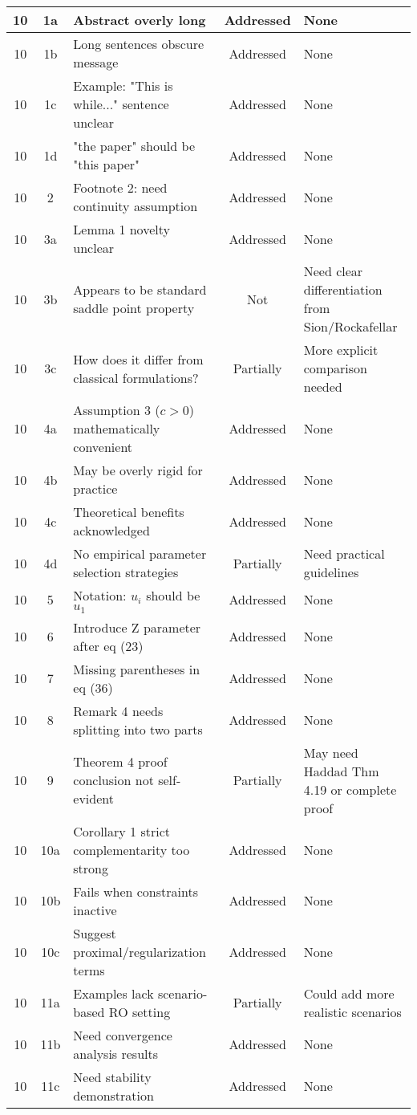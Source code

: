 \documentclass{article}
\begin{document}
\begin{longtable}{|c|c|p{5cm}|c|p{4cm}|}
10 & 1a & Abstract overly long & Addressed & None \\
\hline
10 & 1b & Long sentences obscure message & Addressed & None \\
\hline
10 & 1c & Example: "This is while..." sentence unclear & Addressed & None \\
\hline
10 & 1d & "the paper" should be "this paper" & Addressed & None \\
\hline
10 & 2 & Footnote 2: need continuity assumption & Addressed & None \\
\hline
10 & 3a & Lemma 1 novelty unclear & Addressed & None \\
\hline
10 & 3b & Appears to be standard saddle point property & Not & Need clear differentiation from Sion/Rockafellar \\
\hline
10 & 3c & How does it differ from classical formulations? & Partially & More explicit comparison needed \\
\hline
10 & 4a & Assumption 3 ($c>0$) mathematically convenient & Addressed & None \\
\hline
10 & 4b & May be overly rigid for practice & Addressed & None \\
\hline
10 & 4c & Theoretical benefits acknowledged & Addressed & None \\
\hline
10 & 4d & No empirical parameter selection strategies & Partially & Need practical guidelines \\
\hline
10 & 5 & Notation: $u_i$ should be $u_1$ & Addressed & None \\
\hline
10 & 6 & Introduce Z parameter after eq (23) & Addressed & None \\
\hline
10 & 7 & Missing parentheses in eq (36) & Addressed & None \\
\hline
10 & 8 & Remark 4 needs splitting into two parts & Addressed & None \\
\hline
10 & 9 & Theorem 4 proof conclusion not self-evident & Partially & May need Haddad Thm 4.19 or complete proof \\
\hline
10 & 10a & Corollary 1 strict complementarity too strong & Addressed & None \\
\hline
10 & 10b & Fails when constraints inactive & Addressed & None \\
\hline
10 & 10c & Suggest proximal/regularization terms & Addressed & None \\
\hline
10 & 11a & Examples lack scenario-based RO setting & Partially & Could add more realistic scenarios \\
\hline
10 & 11b & Need convergence analysis results & Addressed & None \\
\hline
10 & 11c & Need stability demonstration & Addressed & None \\
\hline

\hline
\end{longtable}
\end{document}
